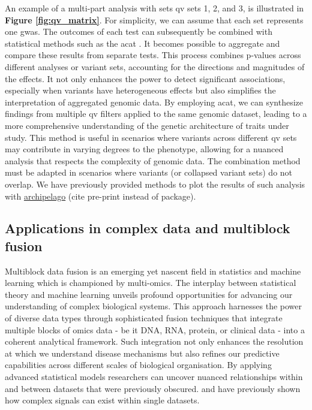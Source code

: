 An example of a multi-part analysis with sets \ac{qv} sets 1, 2, and 3, 
is illustrated in 
\textbf{Figure \ref{fig:qv_matrix}}.
For simplicity, we can assume that each set represents one \ac{gwas}.
The outcomes of each test can subsequently be combined with statistical methods such as the \ac{acat} \cite{liu2019acat, li2020dynamic}.
It becomes possible to aggregate and compare these results from separate tests. 
This process combines p-values across different analyses or variant sets, accounting for the directions and magnitudes of the effects. 
It not only enhances the power to detect significant associations, especially when variants have heterogeneous effects but also simplifies the interpretation of aggregated genomic data. 
By employing \ac{acat}, we can synthesize findings from multiple \ac{qv} filters applied to the same genomic dataset, leading to a more comprehensive understanding of the genetic architecture of traits under study. 
This method is useful in scenarios where variants across different \ac{qv} sets may contribute in varying degrees to the phenotype, allowing for a nuanced analysis that respects the complexity of genomic data.
The combination method must be adapted in scenarios where variants (or collapsed variant sets) do not overlap. 
We have previously provided methods to plot the results of such analysis with \href{https://github.com/DylanLawless/archipelago}{archipelago}  (cite pre-print instead of package).

\subsection{Applications in complex data and multiblock fusion} 

Multiblock data fusion is an emerging yet nascent field in statistics and machine learning  which is championed by multi-omics. 
The interplay between statistical theory and machine learning unveils profound opportunities for advancing our understanding of complex biological systems.
This approach harnesses the power of diverse data types through sophisticated fusion techniques that integrate multiple blocks of omics data - be it DNA, RNA, protein, or clinical data - into a coherent analytical framework. 
Such integration not only enhances the resolution at which we understand disease mechanisms but also refines our predictive capabilities across different scales of biological organisation. 
By applying advanced statistical models 
researchers can uncover nuanced relationships within and between datasets that were previously obscured. 
\citet{kong2018nature} and \citet{howe2021within} have previously shown 
how complex signals can exist within single datasets.

